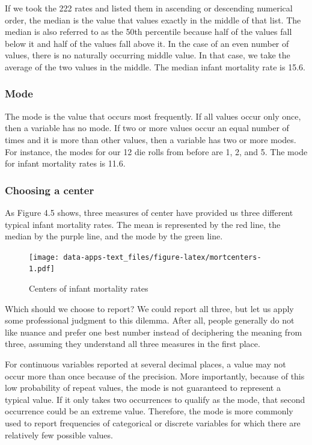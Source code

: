\documentclass[
]{book}
\begin{document}
If we took the 222 rates and listed them in ascending or descending numerical order, the median is the value that values exactly in the middle of that list. The median is also referred to as the 50th percentile because half of the values fall below it and half of the values fall above it. In the case of an even number of values, there is no naturally occurring middle value. In that case, we take the average of the two values in the middle. The median infant mortality rate is 15.6.

\hypertarget{mode}{%
\subsubsection*{Mode}\label{mode}}

The mode is the value that occurs most frequently. If all values occur only once, then a variable has no mode. If two or more values occur an equal number of times and it is more than other values, then a variable has two or more modes. For instance, the modes for our 12 die rolls from before are 1, 2, and 5. The mode for infant mortality rates is 11.6.

\hypertarget{choosing-a-center}{%
\subsubsection*{Choosing a center}\label{choosing-a-center}}

As Figure 4.5 shows, three measures of center have provided us three different typical infant mortality rates. The mean is represented by the red line, the median by the purple line, and the mode by the green line.

\begin{figure}
\centering
\texttt{[image: data-apps-text\_files/figure-latex/mortcenters-1.pdf]}
\caption{\label{fig:mortcenters}Centers of infant mortality rates}
\end{figure}

Which should we choose to report? We could report all three, but let us apply some professional judgment to this dilemma. After all, people generally do not like nuance and prefer one best number instead of deciphering the meaning from three, assuming they understand all three measures in the first place.

For continuous variables reported at several decimal places, a value may not occur more than once because of the precision. More importantly, because of this low probability of repeat values, the mode is not guaranteed to represent a typical value. If it only takes two occurrences to qualify as the mode, that second occurrence could be an extreme value. Therefore, the mode is more commonly used to report frequencies of categorical or discrete variables for which there are relatively few possible values.
\end{document}
